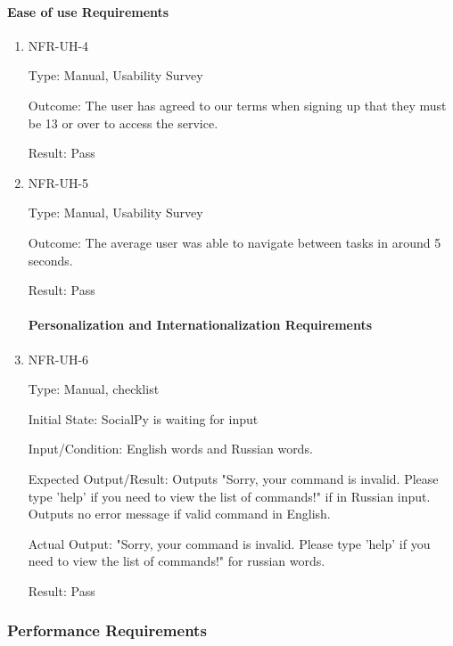 \documentclass[12pt, titlepage]{article}
\begin{document}
\paragraph{Ease of use Requirements}
\begin{enumerate}

\item{NFR-UH-4\\}

Type: Manual, Usability Survey
					
Outcome: The user has agreed to our terms when signing up that they must be 13 or over to access the service.
					
Result: Pass

\item{NFR-UH-5\\}

Type: Manual, Usability Survey
					
Outcome: The average user was able to navigate between tasks in around 5 seconds.
					
Result: Pass

\paragraph{Personalization and Internationalization Requirements}
\item{NFR-UH-6\\}

Type: Manual, checklist

Initial State: SocialPy is waiting for input
					
Input/Condition: English words and Russian words.
					
Expected Output/Result: Outputs "Sorry, your command is invalid. Please type 'help' if you need to view the list of commands!" if in Russian input. Outputs no error message if valid command in English.
		
Actual Output: "Sorry, your command is invalid. Please type 'help' if you need to view the list of commands!" for russian words.
					
Result: Pass

\end{enumerate}
\newpage
\subsubsection{Performance Requirements}
\end{document}
